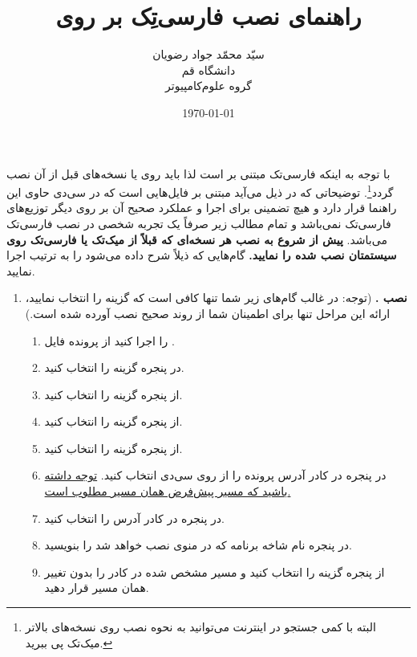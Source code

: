 \documentclass[a4paper]{article}
\title{ راهنمای نصب فارسی‌تِک بر روی \lr{MiK\TeX{}2.4}}
\author{سیّد محمّد جواد رضویان\\
دانشگاه قم\\
گروه علوم‌کامپیوتر}
\date{\today}
\begin{document}
\maketitle
با توجه به اینکه فارسی‌تک مبتنی بر  است لذا باید روی  یا نسخه‌های قبل از آن نصب گردد\footnote{البته با کمی جستجو در اینترنت می‌توانید به نحوه نصب روی نسخه‌های بالاتر میک‌تک پی ببرید.}. توضیحاتی که در ذیل می‌آید مبتنی بر فایل‌هایی است که در سی‌دی حاوی این راهنما قرار دارد و هیچ تضمینی برای اجرا و عملکرد صحیح آن بر روی دیگر  توزیع‌های فارسی‌تک نمی‌باشد و تمام مطالب زیر صرفاً یک تجربه شخصی در نصب فارسی‌تک می‌باشد. \textbf{پیش از شروع به نصب هر نسخه‌ای که قبلاً از میک‌تک یا فارسی‌تک روی سیستمتان نصب شده را  نمایید.} گام‌هایی که ذیلاً  شرح داده می‌شود را به ترتیب اجرا نمایید.
\begin{enumerate}
	\item 
	\textbf{ نصب .}	 (توجه: در غالب گام‌های زیر شما تنها کافی است که گزینه  را انتخاب نمایید، ارائه این مراحل تنها برای اطمینان شما از روند صحیح نصب آورده شده است.)
		\begin{enumerate}
			\item 
		از پرونده   ‬فایل ‪ ‬را اجرا کنید.‬
			\item	
		در پنجره  گزینه  را انتخاب کنید.
			\item
		از پنجره  گزینه  را انتخاب کنید.
			\item
		از پنجره  گزینه  را انتخاب کنید.
			\item
		از پنجره  گزینه  را انتخاب کنید.
			\item
		در پنجره  در کادر   آدرس پرونده  را از روی سی‌دی انتخاب کنید.
\linebreak \underline{توجه داشته باشید که مسیر پیش‌فرض همان مسیر مطلوب است.}
			\item
		در پنجره  در کادر   آدرس  را انتخاب کنید.
			\item 
		در پنجره  نام شاخه‌ برنامه که در منوی  نصب خواهد شد را بنویسید.
			\item 
		از پنجره  گزینه  را انتخاب کنید و مسیر مشخص شده در کادر  را بدون تغییر همان مسیر  قرار دهید.

\end{enumerate}
\end{enumerate}
\end{document}
